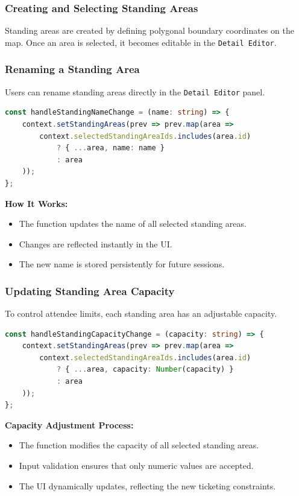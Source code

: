 \subsubsection{Creating and Selecting Standing Areas}
Standing areas are created by defining polygonal boundary coordinates on the map. Once an area is selected, it becomes editable in the \texttt{Detail Editor}.

\subsubsection{Renaming a Standing Area}
Users can rename standing areas directly in the \texttt{Detail Editor} panel.

\begin{lstlisting}[language=TypeScript, caption=Renaming Standing Areas, label=lst:rename-standingarea]
const handleStandingNameChange = (name: string) => {
    context.setStandingAreas(prev => prev.map(area =>
        context.selectedStandingAreaIds.includes(area.id)
            ? { ...area, name: name }
            : area
    ));
};
\end{lstlisting}

\textbf{How It Works:}
\begin{itemize}
    \item The function updates the name of all selected standing areas.
    \item Changes are reflected instantly in the UI.
    \item The new name is stored persistently for future sessions.
\end{itemize}

\subsubsection{Updating Standing Area Capacity}
To control attendee limits, each standing area has an adjustable capacity.

\begin{lstlisting}[language=TypeScript, caption=Updating Standing Area Capacity, label=lst:update-standingarea-capacity]
const handleStandingCapacityChange = (capacity: string) => {
    context.setStandingAreas(prev => prev.map(area =>
        context.selectedStandingAreaIds.includes(area.id)
            ? { ...area, capacity: Number(capacity) }
            : area
    ));
};
\end{lstlisting}

\textbf{Capacity Adjustment Process:}
\begin{itemize}
    \item The function modifies the capacity of all selected standing areas.
    \item Input validation ensures that only numeric values are accepted.
    \item The UI dynamically updates, reflecting the new ticketing constraints.
\end{itemize}

